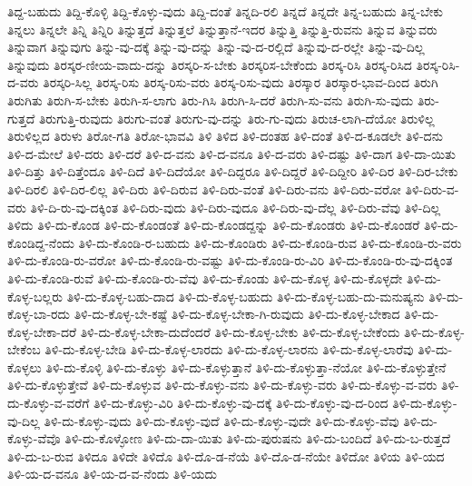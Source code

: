 {ತಿದ್ದ-ಬಹುದು
ತಿದ್ದಿ-ಕೊಳ್ಳಿ
ತಿದ್ದಿ-ಕೊಳ್ಳು-ವುದು
ತಿದ್ದಿ-ದಂತೆ
ತಿನ್ನದಿ-ರಲಿ
ತಿನ್ನದೆ
ತಿನ್ನದೇ
ತಿನ್ನ-ಬಹುದು
ತಿನ್ನ-ಬೇಕು
ತಿನ್ನಲು
ತಿನ್ನಲೇ
ತಿನ್ನಿ
ತಿನ್ನಿರಿ
ತಿನ್ನುತ್ತದೆ
ತಿನ್ನುತ್ತಲೆ
ತಿನ್ನುತ್ತಾನೆ-ಇದರ
ತಿನ್ನುತ್ತಿ
ತಿನ್ನುತ್ತಿ-ರುವನು
ತಿನ್ನುವ
ತಿನ್ನುವರು
ತಿನ್ನುವಾಗ
ತಿನ್ನುವುಗು
ತಿನ್ನು-ವು-ದಕ್ಕೆ
ತಿನ್ನು-ವು-ದನ್ನು
ತಿನ್ನು-ವು-ದ-ರಲ್ಲಿದೆ
ತಿನ್ನುವು-ದ-ರಲ್ಲೇ
ತಿನ್ನು-ವು-ದಿಲ್ಲ
ತಿನ್ನುವುದು
ತಿರಸ್ಕರ-ಣೀಯ-ವಾದು-ದನ್ನು
ತಿರಸ್ಕರಿ-ಸ-ಬೇಕು
ತಿರಸ್ಕರಿಸ-ಬೇಕೆಂದು
ತಿರಸ್ಕ-ರಿಸಿ
ತಿರಸ್ಕ-ರಿಸಿದ
ತಿರಸ್ಕ-ರಿಸಿ-ದ-ವರು
ತಿರಸ್ಕರಿ-ಸಿಲ್ಲ
ತಿರಸ್ಕ-ರಿಸು
ತಿರಸ್ಕ-ರಿಸು-ವರು
ತಿರಸ್ಕ-ರಿಸು-ವುದು
ತಿರಸ್ಕಾರ
ತಿರಸ್ಕಾರ-ಭಾವ-ದಿಂದ
ತಿರುಗಿ
ತಿರುಗಿತು
ತಿರುಗಿ-ಸ-ಬೇಕು
ತಿರುಗಿ-ಸ-ಲಾಗು
ತಿರು-ಗಿಸಿ
ತಿರುಗಿ-ಸಿ-ದರೆ
ತಿರುಗಿ-ಸು-ವನು
ತಿರುಗಿ-ಸು-ವುದು
ತಿರು-ಗುತ್ತದೆ
ತಿರುಗುತ್ತಿ-ರುವುದು
ತಿರುಗು-ವಂತೆ
ತಿರುಗು-ವು-ದನ್ನು
ತಿರು-ಗು-ವುದು
ತಿರುಚ-ಲಾಗಿ-ದೆಯೋ
ತಿರುಳಿಲ್ಲ
ತಿರುಳಿಲ್ಲದ
ತಿರುಳು
ತಿರೋ-ಗತಿ
ತಿರೋ-ಭಾವವಿ
ತಿಳಿ
ತಿಳಿದ
ತಿಳಿ-ದಂತಹ
ತಿಳಿ-ದಂತೆ
ತಿಳಿ-ದ-ಕೂಡಲೇ
ತಿಳಿ-ದನು
ತಿಳಿ-ದ-ಮೇಲೆ
ತಿಳಿ-ದರು
ತಿಳಿ-ದರೆ
ತಿಳಿ-ದ-ವನು
ತಿಳಿ-ದ-ವನೂ
ತಿಳಿ-ದ-ವರು
ತಿಳಿ-ದಷ್ಟು
ತಿಳಿ-ದಾಗ
ತಿಳಿ-ದಾ-ಯಿತು
ತಿಳಿ-ದಿತ್ತು
ತಿಳಿ-ದಿತ್ತೆಂದೂ
ತಿಳಿ-ದಿದೆ
ತಿಳಿ-ದಿದೆಯೋ
ತಿಳಿ-ದಿದ್ದರೂ
ತಿಳಿ-ದಿದ್ದರೆ
ತಿಳಿ-ದಿದ್ದೀರಿ
ತಿಳಿ-ದಿರ
ತಿಳಿ-ದಿರ-ಬೇಕು
ತಿಳಿ-ದಿರಲಿ
ತಿಳಿ-ದಿರ-ಲಿಲ್ಲ
ತಿಳಿ-ದಿರು
ತಿಳಿ-ದಿರುವ
ತಿಳಿ-ದಿರು-ವಂತೆ
ತಿಳಿ-ದಿರು-ವನು
ತಿಳಿ-ದಿರು-ವರೋ
ತಿಳಿ-ದಿರು-ವ-ವರು
ತಿಳಿ-ದಿ-ರು-ವು-ದಕ್ಕಿಂತ
ತಿಳಿ-ದಿರು-ವುದು
ತಿಳಿ-ದಿರು-ವುದೂ
ತಿಳಿ-ದಿರು-ವು-ದೆಲ್ಲ
ತಿಳಿ-ದಿರು-ವೆವು
ತಿಳಿ-ದಿಲ್ಲ
ತಿಳಿದು
ತಿಳಿ-ದು-ಕೊಂಡ
ತಿಳಿ-ದು-ಕೊಂಡಂತೆ
ತಿಳಿ-ದು-ಕೊಂಡದ್ದನ್ನು
ತಿಳಿ-ದು-ಕೊಂಡರು
ತಿಳಿ-ದು-ಕೊಂಡರೆ
ತಿಳಿ-ದು-ಕೊಂಡಿದ್ದ-ನೆಂದು
ತಿಳಿ-ದು-ಕೊಂಡಿ-ರ-ಬಹುದು
ತಿಳಿ-ದು-ಕೊಂಡಿರು
ತಿಳಿ-ದು-ಕೊಂಡಿ-ರುವ
ತಿಳಿ-ದು-ಕೊಂಡಿ-ರು-ವರು
ತಿಳಿ-ದು-ಕೊಂಡಿ-ರು-ವರೋ
ತಿಳಿ-ದು-ಕೊಂಡಿ-ರು-ವಷ್ಟು
ತಿಳಿ-ದು-ಕೊಂಡಿ-ರು-ವಿರಿ
ತಿಳಿ-ದು-ಕೊಂಡಿ-ರು-ವು-ದಕ್ಕಿಂತ
ತಿಳಿ-ದು-ಕೊಂಡಿ-ರುವೆ
ತಿಳಿ-ದು-ಕೊಂಡಿ-ರು-ವೆವು
ತಿಳಿ-ದು-ಕೊಂಡು
ತಿಳಿ-ದು-ಕೊಳ್ಳ
ತಿಳಿ-ದು-ಕೊಳ್ಳದೇ
ತಿಳಿ-ದು-ಕೊಳ್ಳ-ಬಲ್ಲರು
ತಿಳಿ-ದು-ಕೊಳ್ಳ-ಬಹು-ದಾದ
ತಿಳಿ-ದು-ಕೊಳ್ಳ-ಬಹುದು
ತಿಳಿ-ದು-ಕೊಳ್ಳ-ಬಹು-ದು-ಮನುಷ್ಯನು
ತಿಳಿ-ದು-ಕೊಳ್ಳ-ಬಾ-ರದು
ತಿಳಿ-ದು-ಕೊಳ್ಳ-ಬೇ-ಕಷ್ಟೆ
ತಿಳಿ-ದು-ಕೊಳ್ಳ-ಬೇಕಾ-ಗಿ-ರುವುದು
ತಿಳಿ-ದು-ಕೊಳ್ಳ-ಬೇಕಾದ
ತಿಳಿ-ದು-ಕೊಳ್ಳ-ಬೇಕಾ-ದರೆ
ತಿಳಿ-ದು-ಕೊಳ್ಳ-ಬೇಕಾ-ದುದೆಂದರೆ
ತಿಳಿ-ದು-ಕೊಳ್ಳ-ಬೇಕು
ತಿಳಿ-ದು-ಕೊಳ್ಳ-ಬೇಕೆಂದು
ತಿಳಿ-ದು-ಕೊಳ್ಳ-ಬೇಕೆಂಬ
ತಿಳಿ-ದು-ಕೊಳ್ಳ-ಬೇಡಿ
ತಿಳಿ-ದು-ಕೊಳ್ಳ-ಲಾರದು
ತಿಳಿ-ದು-ಕೊಳ್ಳ-ಲಾರನು
ತಿಳಿ-ದು-ಕೊಳ್ಳ-ಲಾರೆವು
ತಿಳಿ-ದು-ಕೊಳ್ಳಲು
ತಿಳಿ-ದು-ಕೊಳ್ಳಿ
ತಿಳಿ-ದು-ಕೊಳ್ಳು
ತಿಳಿ-ದು-ಕೊಳ್ಳುತ್ತಾನೆ
ತಿಳಿ-ದು-ಕೊಳ್ಳುತ್ತಾ-ನೆಯೋ
ತಿಳಿ-ದು-ಕೊಳ್ಳುತ್ತೇನೆ
ತಿಳಿ-ದು-ಕೊಳ್ಳುತ್ತೇವೆ
ತಿಳಿ-ದು-ಕೊಳ್ಳುವ
ತಿಳಿ-ದು-ಕೊಳ್ಳು-ವನು
ತಿಳಿ-ದು-ಕೊಳ್ಳು-ವರು
ತಿಳಿ-ದು-ಕೊಳ್ಳು-ವ-ವರು
ತಿಳಿ-ದು-ಕೊಳ್ಳು-ವ-ವರೆಗೆ
ತಿಳಿ-ದು-ಕೊಳ್ಳು-ವಿರಿ
ತಿಳಿ-ದು-ಕೊಳ್ಳು-ವು-ದಕ್ಕೆ
ತಿಳಿ-ದು-ಕೊಳ್ಳು-ವು-ದ-ರಿಂದ
ತಿಳಿ-ದು-ಕೊಳ್ಳು-ವು-ದಿಲ್ಲ
ತಿಳಿ-ದು-ಕೊಳ್ಳು-ವುದು
ತಿಳಿ-ದು-ಕೊಳ್ಳು-ವುದೆ
ತಿಳಿ-ದು-ಕೊಳ್ಳು-ವುದೇ
ತಿಳಿ-ದು-ಕೊಳ್ಳು-ವೆವು
ತಿಳಿ-ದು-ಕೊಳ್ಳು-ವೆವೊ
ತಿಳಿ-ದು-ಕೊಳ್ಳೋಣ
ತಿಳಿ-ದು-ದಾ-ಯಿತು
ತಿಳಿ-ದು-ಪುರುಷನು
ತಿಳಿ-ದು-ಬಂದಿದೆ
ತಿಳಿ-ದು-ಬ-ರುತ್ತದೆ
ತಿಳಿ-ದು-ಬ-ರುವ
ತಿಳಿದೂ
ತಿಳಿದೇ
ತಿಳಿದೊ
ತಿಳಿ-ದೊ-ಡ-ನೆಯೆ
ತಿಳಿ-ದೊ-ಡ-ನೆಯೇ
ತಿಳಿದೋ
ತಿಳಿಯ
ತಿಳಿ-ಯದ
ತಿಳಿ-ಯ-ದ-ವನೂ
ತಿಳಿ-ಯ-ದ-ವ-ನೆಂದು
ತಿಳಿ-ಯದು
}
